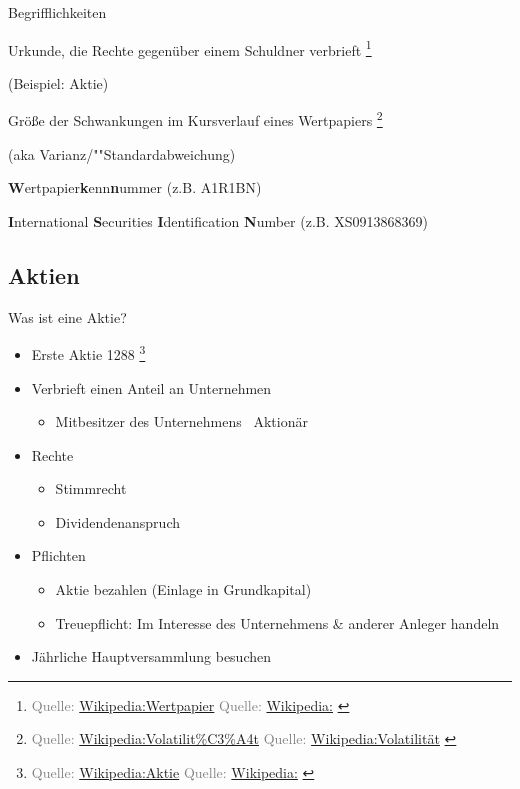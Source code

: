 \documentclass{beamer}
\let\oldfootnote\footnote
\renewcommand{\footnote}[1]
{%
	\oldfootnote
	{
		\tiny
		\textcolor{gray}{#1}
	}%
}
\newcommand{\citewiki}[2][]
{%
	\footnote
	{
		\ifthenelse{\isempty{#1}}
		{
			Quelle: \href{https://de.wikipedia.org/wiki/#2}{Wikipedia:#2}
		}
		{
			Quelle: \href{https://de.wikipedia.org/wiki/#2}{Wikipedia:#1}
		}
	}
}
\begin{document}
		\begin{frame}{Begrifflichkeiten}
			\begin{description}[labelwidth=0cm]
				\item[Wertpapier] Urkunde, die Rechte gegenüber einem Schuldner verbrieft\citewiki{Wertpapier}(Beispiel: Aktie)
				\item[Volatilität] Größe der Schwankungen im Kursverlauf eines Wertpapiers\citewiki[Volatilität]{Volatilit\%C3\%A4t}(aka Varianz/""Standardabweichung)
				\item[WKN] \textbf{W}ertpapier\textbf{k}enn\textbf{n}ummer (z.B. A1R1BN)
				\item[ISIN] \textbf{I}nternational \textbf{S}ecurities \textbf{I}dentification \textbf{N}umber (z.B. XS0913868369)
			\end{description}
		\end{frame}
	
		\subsection{Aktien}
		
			\begin{frame}
				\vspace{0.5cm}
				\begin{center}
					Was ist eine Aktie?
				\end{center}
			\end{frame}
			
			\begin{frame}
				\begin{itemize}
					\item Erste Aktie 1288\citewiki{Aktie}
					\item Verbrieft einen Anteil an Unternehmen
					\begin{itemize}
						\item Mitbesitzer des Unternehmens \textrightarrow\ Aktionär
					\end{itemize}
					\item Rechte
					\begin{itemize}
						\item Stimmrecht
						\item Dividendenanspruch
					\end{itemize}
					\item Pflichten
					\begin{itemize}
						\item Aktie bezahlen (Einlage in Grundkapital)
						\item Treuepflicht: Im Interesse des Unternehmens \& anderer Anleger handeln
					\end{itemize}
					\item Jährliche Hauptversammlung besuchen
				\end{itemize}
			\end{frame}
		
\end{document}
